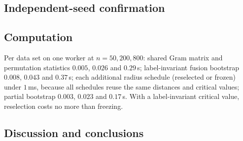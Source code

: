 

\subsection{Independent-seed confirmation}\label{sec:confirm}

\subsection{Computation}\label{sec:compB}
Per data set on one worker at $n=50,200,800$: shared Gram matrix and permutation statistics $0.005$, $0.026$ and $0.29$\,s; label-invariant fusion bootstrap $0.008$, $0.043$ and $0.37$\,s; each additional radius schedule (reselected or frozen) under $1$\,ms, because all schedules reuse the same distances and critical values; partial bootstrap $0.003$, $0.023$ and $0.17$\,s. With a label-invariant critical value, reselection costs no more than freezing.

\subsection{Discussion and conclusions}\label{sec:discussion}

